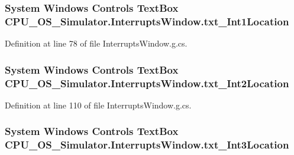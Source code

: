 \subsubsection[{txt\+\_\+\+Int1\+Location}]{\setlength{\rightskip}{0pt plus 5cm}System Windows Controls Text\+Box C\+P\+U\+\_\+\+O\+S\+\_\+\+Simulator.\+Interrupts\+Window.\+txt\+\_\+\+Int1\+Location\hspace{0.3cm}{\ttfamily [package]}}\label{class_c_p_u___o_s___simulator_1_1_interrupts_window_a25ab24a2ca5773a8bed6423333924ec1}


Definition at line 78 of file Interrupts\+Window.\+g.\+cs.

\hypertarget{class_c_p_u___o_s___simulator_1_1_interrupts_window_a9e1fdb0d7e2bf6e782b6dfb6894fb5d1}{}
\subsubsection[{txt\+\_\+\+Int2\+Location}]{\setlength{\rightskip}{0pt plus 5cm}System Windows Controls Text\+Box C\+P\+U\+\_\+\+O\+S\+\_\+\+Simulator.\+Interrupts\+Window.\+txt\+\_\+\+Int2\+Location\hspace{0.3cm}{\ttfamily [package]}}\label{class_c_p_u___o_s___simulator_1_1_interrupts_window_a9e1fdb0d7e2bf6e782b6dfb6894fb5d1}


Definition at line 110 of file Interrupts\+Window.\+g.\+cs.

\hypertarget{class_c_p_u___o_s___simulator_1_1_interrupts_window_a8ee7798219efa17571dcb328c1898b73}{}
\subsubsection[{txt\+\_\+\+Int3\+Location}]{\setlength{\rightskip}{0pt plus 5cm}System Windows Controls Text\+Box C\+P\+U\+\_\+\+O\+S\+\_\+\+Simulator.\+Interrupts\+Window.\+txt\+\_\+\+Int3\+Location\hspace{0.3cm}{\ttfamily [package]}}\label{class_c_p_u___o_s___simulator_1_1_interrupts_window_a8ee7798219efa17571dcb328c1898b73}


